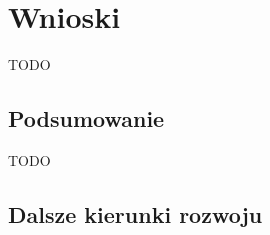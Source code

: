 \documentclass[thesis]{subfiles}
\begin{document}
\chapter{Wnioski}

TODO


\section{Podsumowanie}

TODO


\section{Dalsze kierunki rozwoju}
\end{document}
